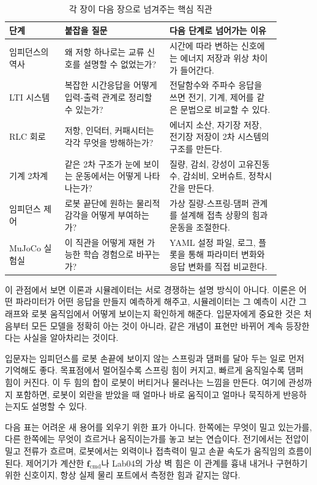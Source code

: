 \begin{table}[!htbp]
  \centering
  \caption{각 장이 다음 장으로 넘겨주는 핵심 직관}
  \begin{tabular}{p{0.18\linewidth}p{0.34\linewidth}p{0.36\linewidth}}
    \toprule
    단계 & 붙잡을 질문 & 다음 단계로 넘어가는 이유 \\
    \midrule
    임피던스의 역사 & 왜 저항 하나로는 교류 신호를 설명할 수 없었는가? & 시간에 따라 변하는 신호에는 에너지 저장과 위상 차이가 들어간다. \\
    LTI 시스템 & 복잡한 시간응답을 어떻게 입력-출력 관계로 정리할 수 있는가? & 전달함수와 주파수 응답을 쓰면 전기, 기계, 제어를 같은 문법으로 비교할 수 있다. \\
    RLC 회로 & 저항, 인덕터, 커패시터는 각각 무엇을 방해하는가? & 에너지 소산, 자기장 저장, 전기장 저장이 2차 시스템의 구조를 만든다. \\
    기계 2차계 & 같은 2차 구조가 눈에 보이는 운동에서는 어떻게 나타나는가? & 질량, 감쇠, 강성이 고유진동수, 감쇠비, 오버슈트, 정착시간을 만든다. \\
    임피던스 제어 & 로봇 끝단에 원하는 물리적 감각을 어떻게 부여하는가? & 가상 질량-스프링-댐퍼 관계를 설계해 접촉 상황의 힘과 운동을 조절한다. \\
    MuJoCo 실험실 & 이 직관을 어떻게 재현 가능한 학습 경험으로 바꾸는가? & YAML 설정 파일, 로그, 플롯을 통해 파라미터 변화와 응답 변화를 직접 비교한다. \\
    \bottomrule
  \end{tabular}
\end{table}

이 관점에서 보면 이론과 시뮬레이터는 서로 경쟁하는 설명 방식이 아니다.
이론은 어떤 파라미터가 어떤 응답을 만들지 예측하게 해주고, 시뮬레이터는 그 예측이 시간 그래프와 로봇 움직임에서 어떻게 보이는지 확인하게 해준다.
입문자에게 중요한 것은 처음부터 모든 모델을 정확히 아는 것이 아니라, 같은 개념이 표현만 바뀌어 계속 등장한다는 사실을 알아차리는 것이다.

입문자는 임피던스를 로봇 손끝에 보이지 않는 스프링과 댐퍼를 달아 두는 일로 먼저 기억해도 좋다.
목표점에서 멀어질수록 스프링 힘이 커지고, 빠르게 움직일수록 댐퍼 힘이 커진다.
이 두 힘의 합이 로봇이 버티거나 물러나는 느낌을 만든다.
여기에 관성까지 포함하면, 로봇이 외란을 받았을 때 얼마나 바로 움직이고 얼마나 묵직하게 반응하는지도 설명할 수 있다.

다음 표는 어려운 새 용어를 외우기 위한 표가 아니다.
한쪽에는 무엇이 밀고 있는가를, 다른 한쪽에는 무엇이 흐르거나 움직이는가를 놓고 보는 연습이다.
전기에서는 전압이 밀고 전류가 흐르며, 로봇에서는 외력이나 접촉력이 밀고 손끝 속도가 움직임의 흐름이 된다.
제어기가 계산한 \(\bm{f}_{\mathrm{cmd}}\)나 Lab04의 가상 벽 힘은 이 관계를 흉내 내거나 구현하기 위한 신호이지, 항상 실제 물리 포트에서 측정한 힘과 같지는 않다.

